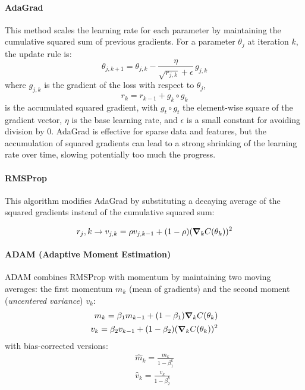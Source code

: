 \documentclass[11pt,a4paper,twocolumn]{article}
\begin{document}
\paragraph{AdaGrad} 
This method scales the learning rate for each parameter by maintaining the cumulative squared sum of previous gradients. 
For a parameter $\theta_j$ at iteration $k$, the update rule is:
\begin{equation}
	\theta_{j, k+1} = \theta_{j, k} - \frac{\eta}{\sqrt{r_{j, k}} + \epsilon} \, g_{j,k}
\end{equation}
where $g_{j,k}$ is the gradient of the loss with respect to $\theta_j$, 
\begin{equation}
	r_k = r_{k-1} + g_k \circ g_k
\end{equation}
is the accumulated squared gradient, with $g_t \circ g_t$ the element-wise square of the gradient vector, $\eta$ is the base learning rate, and $\epsilon$ is a small constant for avoiding division by 0. 
AdaGrad is effective for sparse data and features,
but the accumulation of squared gradients can lead to a strong shrinking of the learning rate over time, slowing potentially too much the progress.

\paragraph{RMSProp} 
This algorithm \parencite{goodfellow_2016} modifies AdaGrad by substituting a decaying average of the squared gradients instead of the cumulative squared sum:

\begin{equation}
	r_j,k \rightarrow v_{j,k} = \rho v_{j,k-1} + (1-\rho)(\grad_k C(\theta_k))^2
\end{equation}

\paragraph{ADAM (Adaptive Moment Estimation)} 

ADAM \parencite{kingma:adam} combines RMSProp with momentum by maintaining two moving averages: 
the first momentum $m_k$ (mean of gradients) and the second moment (\emph{uncentered variance}) $v_k$:
\begin{align}
	m_k = \beta_1 m_{k-1} + (1-\beta_1) \grad_k C(\theta_k) \\
	v_k = \beta_2 v_{k-1} + (1-\beta_2)(\grad_k C(\theta_k))^2
\end{align}
with bias-corrected versions:
\begin{align}
	\hat{m}_k = \frac{m_k}{1 - \beta_1^k}\\
	\hat{v}_k = \frac{v_k}{1 - \beta_2^k}
\end{align}
\end{document}

